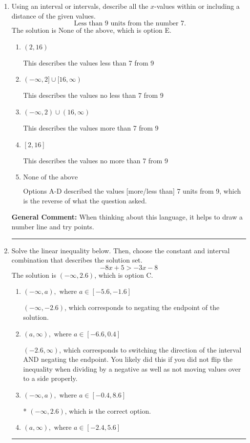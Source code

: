 \documentclass{extbook}[14pt]
\newcommand{\litem}[1]{\item #1

\rule{\textwidth}{0.4pt}}
\begin{document}
\begin{enumerate}\litem{
Using an interval or intervals, describe all the $x$-values within or including a distance of the given values.
\[ \text{ Less than } 9 \text{ units from the number } 7. \]The solution is \( \text{None of the above} \), which is option E.\begin{enumerate}[label=\Alph*.]
\item \( (2, 16) \)

This describes the values less than 7 from 9
\item \( (-\infty, 2] \cup [16, \infty) \)

This describes the values no less than 7 from 9
\item \( (-\infty, 2) \cup (16, \infty) \)

This describes the values more than 7 from 9
\item \( [2, 16] \)

This describes the values no more than 7 from 9
\item \( \text{None of the above} \)

Options A-D described the values [more/less than] 7 units from 9, which is the reverse of what the question asked.
\end{enumerate}

\textbf{General Comment:} When thinking about this language, it helps to draw a number line and try points.
}
\litem{
Solve the linear inequality below. Then, choose the constant and interval combination that describes the solution set.
\[ -8x + 5 > -3x -8 \]The solution is \( (-\infty, 2.6) \), which is option C.\begin{enumerate}[label=\Alph*.]
\item \( (-\infty, a), \text{ where } a \in [-5.6, -1.6] \)

 $(-\infty, -2.6)$, which corresponds to negating the endpoint of the solution.
\item \( (a, \infty), \text{ where } a \in [-6.6, 0.4] \)

 $(-2.6, \infty)$, which corresponds to switching the direction of the interval AND negating the endpoint. You likely did this if you did not flip the inequality when dividing by a negative as well as not moving values over to a side properly.
\item \( (-\infty, a), \text{ where } a \in [-0.4, 8.6] \)

* $(-\infty, 2.6)$, which is the correct option.
\item \( (a, \infty), \text{ where } a \in [-2.4, 5.6] \)


\end{enumerate}}
\end{enumerate}
\end{document}
